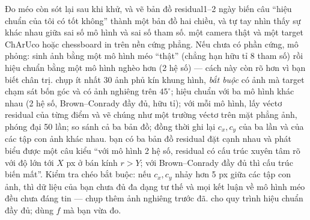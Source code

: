 \documentclass[../../marker.tex]{subfiles}
\begin{document}
\begin{ungdung}
\end{ungdung}

\begin{duan}{Đo méo còn sót lại sau khi khử, và vẽ bản đồ residual}{1--2 ngày}
\dmt biến câu ``hiệu chuẩn của tôi có tốt không'' thành một bản đồ hai chiều, và tự tay nhìn thấy sự khác nhau giữa sai số mô hình và sai số tham số.
\ddl một camera thật và một target ChArUco hoặc chessboard in trên nền cứng phẳng. Nếu chưa có phần cứng, mô phỏng: sinh ảnh bằng một mô hình méo ``thật'' (chẳng hạn hữu tỉ 8 tham số) rồi hiệu chuẩn bằng một mô hình nghèo hơn (2 hệ số) --- cách này còn rõ hơn vì bạn biết chân trị.
\dbc chụp ít nhất 30 ảnh phủ kín khung hình, \emph{bắt buộc} có ảnh mà target chạm sát bốn góc và có ảnh nghiêng trên \(45^\circ\); hiệu chuẩn với ba mô hình khác nhau (2 hệ số, Brown--Conrady đầy đủ, hữu tỉ); với mỗi mô hình, lấy véctơ residual của từng điểm và vẽ chúng như một trường véctơ trên mặt phẳng ảnh, phóng đại 50 lần; so sánh cả ba bản đồ; đồng thời ghi lại \(c_x, c_y\) của ba lần và của các tập con ảnh khác nhau.
\dxk bạn có ba bản đồ residual đặt cạnh nhau và phát biểu được một câu kiểu ``với mô hình 2 hệ số, residual có cấu trúc xuyên tâm rõ với độ lớn tới \(X\) px ở bán kính \(r > Y\); với Brown--Conrady đầy đủ thì cấu trúc biến mất''. Kiểm tra chéo bắt buộc: nếu \(c_x, c_y\) nhảy hơn 5 px giữa các tập con ảnh, thì dữ liệu của bạn chưa đủ đa dạng tư thế và mọi kết luận về mô hình méo đều chưa đáng tin --- chụp thêm ảnh nghiêng trước đã.
\dnv {} cho quy trình hiệu chuẩn đầy đủ;  dùng \(f\) mà bạn vừa đo.
\end{duan}
\end{document}
